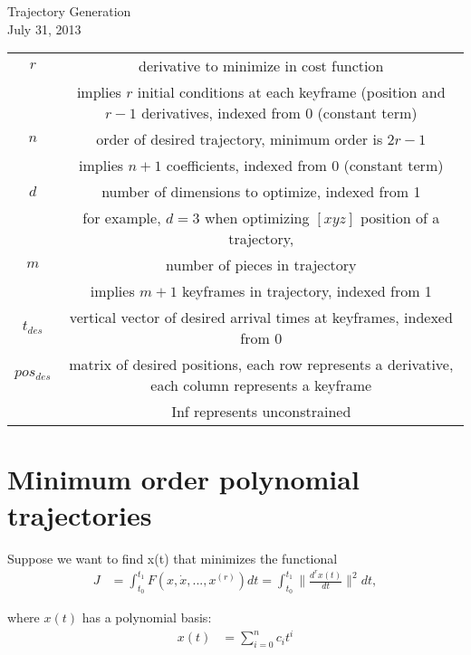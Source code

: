 \documentclass[11pt]{article}
\begin{document}
\centering
Trajectory Generation \\
July 31, 2013

\raggedright

\begin{table} [h!]
\footnotesize
\begin{tabular}{ c c }
	$r$ & derivative to minimize in cost function \\
		& implies $r$ initial conditions at each keyframe (position and $r-1$ derivatives, indexed from 0 (constant term) \\
	$n$ & order of desired trajectory, minimum order is $2r-1$ \\
		&  implies $n+1$ coefficients, indexed from 0 (constant term) \\
	$d$ & number of dimensions to optimize, indexed from 1 \\
	 	& for example, $d=3$ when optimizing $[x y z]$ position of a trajectory,  \\
	$m$ & number of pieces in trajectory \\
		& implies $m+1$ keyframes in trajectory, indexed from 1 \\
	$t_{des}$ & vertical vector of desired arrival times at keyframes, indexed from 0 \\
	$pos_{des}$ & matrix of desired positions, each row represents a derivative, each column represents a keyframe \\
		&  Inf represents unconstrained  \\
\end{tabular}
\label{tab: vars}
\end{table}




\newpage
\small






\section{Minimum order polynomial trajectories}

Suppose we want to find x(t) that minimizes the functional
\begin{align*}
J &= \int_{t_0}^{t_1} F(x, \dot{x}, ..., x^{(r)}) dt = \int_{t_0}^{t_1} \|  \frac{d^{r} x(t) }{dt} \|^2 dt,
\end{align*}

where $x(t)$ has a polynomial basis:
\begin{align*}
x(t) &= \sum_{i = 0}^{n} c_i t^i
\end{align*}
\end{document}
